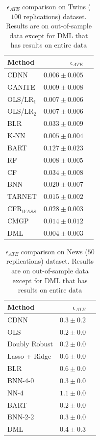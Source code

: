 \documentclass[sigconf]{acmart}
\theoremstyle{plain}
\numberwithin{equation}{section}
\begin{document}
\begin{center}
	\begin{table}[h]
		\centering
		\caption{$\epsilon_{ATE}$ comparison on Twins ($100$ replications) dataset. Results are on out-of-sample data except for DML that has results on entire data}
		\label{table:ATE_PEHE_Twins}
		\begin{tabular}{|l|r|r|}
			\hline
			Method &$\epsilon_{ATE}$\\ 
			\hline
			CDNN &   $0.006\pm0.005$ \\
			\hline
			GANITE&  $0.009\pm0.008$\\
			OLS/LR$_1$ &   $0.007\pm0.006$\\
			OLS/LR$_2$ &   $0.007\pm0.006$\\
			BLR &   $0.033\pm0.009$\\
			K-NN &    $0.005\pm0.004$\\
			BART &   $0.127\pm0.023$\\
			RF &    $0.008\pm0.005$\\
			CF &    $0.034\pm0.008$\\
			BNN &      $0.020\pm0.007$\\
			TARNET&    $0.015\pm0.002$\\
			CFR$_{W ASS}$&   $0.028\pm0.003$\\
			CMGP &     $0.014\pm0.012$\\
			DML  &$\bm{0.004}\pm0.003$\\ 
			\hline			
		\end{tabular}
	\end{table}
\end{center}


\begin{center}
	\begin{table}[h]
		\centering
		\caption{$\epsilon_{ATE}$ comparison on News ($50$ replications) dataset. Results are on out-of-sample data except for DML that has results on entire data}
		\label{table:ATE_PEHE_News}
		\begin{tabular}{|l|r|r|}
			\hline
			Method &$\epsilon_{ATE}$\\ 
			\hline
			CDNN &  $0.3\pm0.2$ \\
			\hline
			OLS &  $\bm{0.2}\pm0.0$ \\
			Doubly Robust &  $\bm{0.2}\pm0.0$ \\
			Lasso + Ridge &  $0.6\pm0.0$ \\
			BLR &  $0.6\pm0.0$ \\
			BNN-4-0 &  $0.3\pm0.0$ \\
			NN-4 &  $1.1\pm0.0$\\
			BART & $\bm{0.2}\pm0.0$ \\
			BNN-2-2 & $0.3\pm0.0$ \\
			DML  & $0.4\pm0.3$\\ 
			\hline			
		\end{tabular}
	\end{table}
\end{center}
\end{document}
